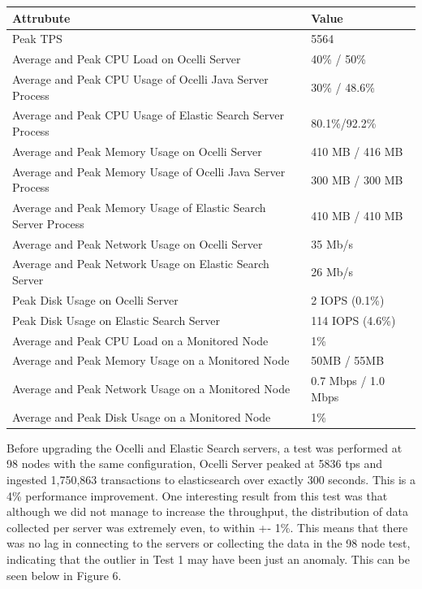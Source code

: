 \documentclass{llncs}
\begin{document}
\begin{flushleft}
    \begin{tabular}{ | l | l |}
    \hline
  Attrubute & Value  \\ \hline
  Peak TPS & 5564  \\ \hline
  Average and Peak CPU Load on Ocelli Server & 40\% / 50\%  \\ \hline
  Average and Peak CPU Usage of Ocelli Java Server Process & 30\% / 48.6\% \\ \hline
 Average and Peak CPU Usage of Elastic Search Server Process & 80.1\%/92.2\%	  \\ \hline
  Average and Peak Memory Usage on Ocelli Server & 410 MB / 416 MB	 \\ \hline
  Average and Peak Memory Usage of Ocelli Java Server Process &	300 MB / 300 MB		 \\ \hline
 Average and Peak Memory Usage of Elastic Search Server Process &	410 MB / 410 MB		 \\ \hline
Average and Peak Network Usage on Ocelli Server &	35 Mb/s 	 \\ \hline
Average and Peak Network Usage on Elastic Search Server & 26 Mb/s 	 \\ \hline
Peak Disk Usage on Ocelli Server &	2 IOPS (0.1\%)		 \\ \hline
Peak Disk Usage on Elastic Search Server &	114 IOPS (4.6\%)		 \\ \hline
Average and Peak CPU Load on a Monitored Node& 	1\% 	 \\ \hline
  Average and Peak Memory Usage on a Monitored Node &	50MB / 55MB	 \\ \hline
Average and Peak Network Usage on a Monitored Node &	0.7 Mbps / 1.0 Mbps		 \\ \hline
  Average and Peak Disk Usage on a Monitored Node &  1\%	\\ 
    \hline
    \end{tabular}
\end{flushleft}
\pagebreak
Before upgrading the Ocelli and Elastic Search servers, a test was performed at 98 nodes with the same configuration, Ocelli Server peaked at 5836 tps and ingested 1,750,863 transactions to elasticsearch over exactly 300 seconds. This is a 4\% performance improvement. One interesting result from this test was that although we did not manage to increase the throughput, the distribution of data collected per server was extremely even, to within +- 1\%. This means that there was no lag in connecting to the servers or collecting the data in the 98 node test, indicating that the outlier in Test 1 may have been just an anomaly. This can be seen below in Figure 6.
\end{document}
